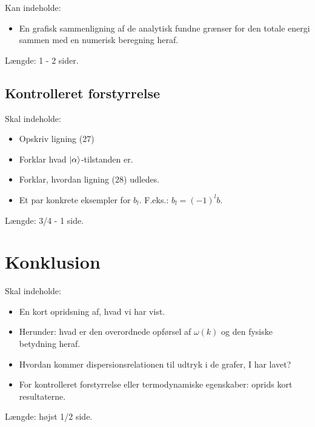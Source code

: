 \documentclass[10pt]{article}
\begin{document}
Kan indeholde:
\begin{itemize}
\item En grafisk sammenligning af de analytisk fundne grænser for den totale energi sammen med en numerisk beregning heraf. 
\end{itemize}

Længde: 1 - 2 sider.

\subsection{Kontrolleret forstyrrelse}
Skal indeholde:
\begin{itemize}
\item Opskriv ligning (27)
\item Forklar hvad $\ket{\alpha}$-tilstanden er. 
\item Forklar, hvordan ligning (28) udledes. 
\item Et par konkrete eksempler for $b_l$. F.eks.: $b_l = (-1)^l b$.
\end{itemize}
Længde: 3/4 - 1 side.


\section{Konklusion}
Skal indeholde:
\begin{itemize}
\item En kort opridsning af, hvad vi har vist. 
\item Herunder: hvad er den overordnede opførsel af $\omega(k)$ og den fysiske betydning heraf.
\item Hvordan kommer dispersionsrelationen til udtryk i de grafer, I har lavet? 
\item For kontrolleret forstyrrelse eller termodynamiske egenskaber: oprids kort resultaterne.
\end{itemize}

Længde: højst 1/2 side. 
\end{document}
